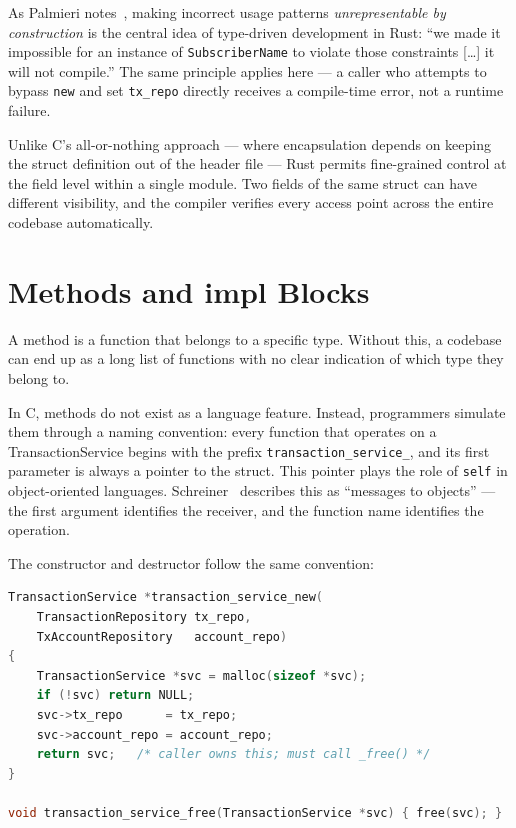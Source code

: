 As Palmieri notes~\cite{Palmieri2022}, making incorrect usage patterns
\emph{unrepresentable by construction} is the central idea of type-driven
development in Rust: ``we made it impossible for an instance of
\texttt{SubscriberName} to violate those constraints [\ldots] it will not
compile.'' The same principle applies here --- a caller who attempts to
bypass \texttt{new} and set \texttt{tx\_repo} directly receives a
compile-time error, not a runtime failure.

Unlike C's all-or-nothing approach --- where encapsulation depends on
keeping the struct definition out of the header file --- Rust permits
fine-grained control at the field level within a single module. Two fields
of the same struct can have different visibility, and the compiler verifies
every access point across the entire codebase automatically.

\section{Methods and impl Blocks}
\label{sec:ch4sec2}

A method is a function that belongs to a specific type. Without this, a codebase 
can end up as a long list of functions with no clear indication of 
which type they belong to.

In C, methods do not exist as a language feature. Instead, programmers
simulate them through a naming convention: every function that operates on
a TransactionService begins with the prefix
\texttt{transaction\_service\_}, and its first parameter is always a pointer
to the struct. This pointer plays the role of \texttt{self} in
object-oriented languages. Schreiner~\cite{Schreiner1993} describes this as
``messages to objects'' --- the first argument identifies the receiver, and
the function name identifies the operation.

The constructor and destructor follow the same convention:

\begin{lstlisting}[language=C, caption={transaction\_service.c ---
Constructor and destructor follow the \texttt{type\_verb} naming convention.
The \texttt{svc} parameter is the implicit ``self'' of the method.}]
TransactionService *transaction_service_new(
    TransactionRepository tx_repo,
    TxAccountRepository   account_repo)
{
    TransactionService *svc = malloc(sizeof *svc);
    if (!svc) return NULL;
    svc->tx_repo      = tx_repo;
    svc->account_repo = account_repo;
    return svc;   /* caller owns this; must call _free() */
}

void transaction_service_free(TransactionService *svc) { free(svc); }
\end{lstlisting}

